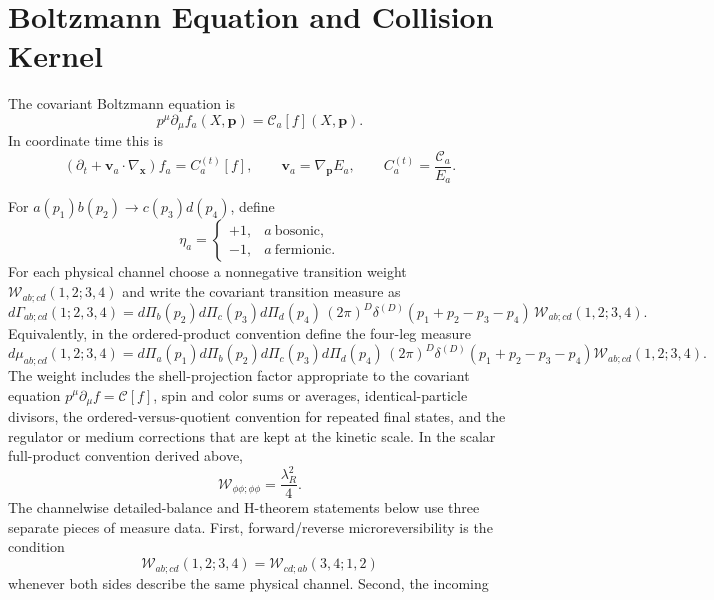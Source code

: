 \section{Boltzmann Equation and Collision Kernel}

The covariant Boltzmann equation is
\begin{equation}
  p^\mu\partial_\mu f_a(X,\mathbf p)=\mathcal C_a[f](X,\mathbf p).
  \label{eq:kinetic-covariant-boltzmann}
\end{equation}
In coordinate time this is
\[
  \left(\partial_t+\mathbf v_a\cdot\nabla_{\mathbf x}\right)f_a
  =
  C^{(t)}_a[f],
  \qquad
  \mathbf v_a=\nabla_{\mathbf p}E_a,
  \qquad
  C^{(t)}_a=\frac{\mathcal C_a}{E_a}.
\]

For \(a(p_1)b(p_2)\to c(p_3)d(p_4)\), define
\[
  \eta_a=
  \begin{cases}
    +1,& a\ \text{bosonic},\\
    -1,& a\ \text{fermionic}.
  \end{cases}
\]
For each physical channel choose a nonnegative transition weight
\(\mathcal W_{ab;cd}(1,2;3,4)\) and write the covariant transition measure as
\begin{equation}
  d\Gamma_{ab;cd}(1;2,3,4)
  =
  d\Pi_b(p_2)d\Pi_c(p_3)d\Pi_d(p_4)\,
  (2\pi)^D\delta^{(D)}(p_1+p_2-p_3-p_4)\,
  \mathcal W_{ab;cd}(1,2;3,4).
  \label{eq:kinetic-transition-measure}
\end{equation}
Equivalently, in the ordered-product convention define the four-leg measure
\[
  d\mu_{ab;cd}(1,2;3,4)
  =
  d\Pi_a(p_1)d\Pi_b(p_2)d\Pi_c(p_3)d\Pi_d(p_4)\,
  (2\pi)^D\delta^{(D)}(p_1+p_2-p_3-p_4)
  \mathcal W_{ab;cd}(1,2;3,4).
\]
The weight includes the shell-projection factor appropriate to the covariant
equation \(p^\mu\partial_\mu f=\mathcal C[f]\), spin and color sums or
averages, identical-particle divisors, the ordered-versus-quotient convention
for repeated final states, and the regulator or medium corrections that are
kept at the kinetic scale.  In the scalar full-product convention derived
above,
\[
  \mathcal W_{\phi\phi;\phi\phi}=\frac{\lambda_R^2}{4}.
\]
The channelwise detailed-balance and H-theorem statements below use three
separate pieces of measure data.  First, forward/reverse microreversibility
is the condition
\begin{equation}
  \mathcal W_{ab;cd}(1,2;3,4)
  =
  \mathcal W_{cd;ab}(3,4;1,2)
  \label{eq:kinetic-transition-microreversibility}
\end{equation}
whenever both sides describe the same physical channel.  Second, the incoming
